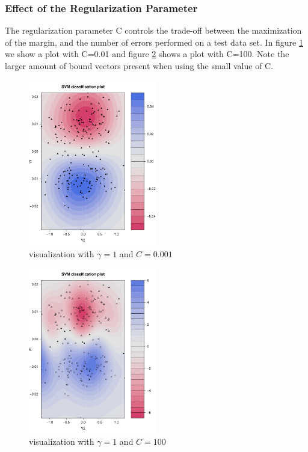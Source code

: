 \documentclass[11pt]{article}
\begin{document}
\subsubsection{Effect of the Regularization Parameter}
The regularization parameter C controls the trade-off between the maximization of the margin, and the number of errors performed on a test data set. In figure \ref{smallC} we show a plot with C=0.01 and figure \ref{bigC} shows a plot with C=100. Note the larger amount of bound vectors present when using the small value of C.
\begin{figure}[h!]
  \centering
\includegraphics[width=0.5\textwidth]{smallC}
\caption{visualization with $\gamma=1$ and $C=0.001$ }
\label{smallC}
\end{figure}
\begin{figure}[h!]
  \centering
\includegraphics[width=0.5\textwidth]{bigC}
\caption{visualization with $\gamma=1$ and $C=100$ }
\label{bigC}
\end{figure}
\end{document}

